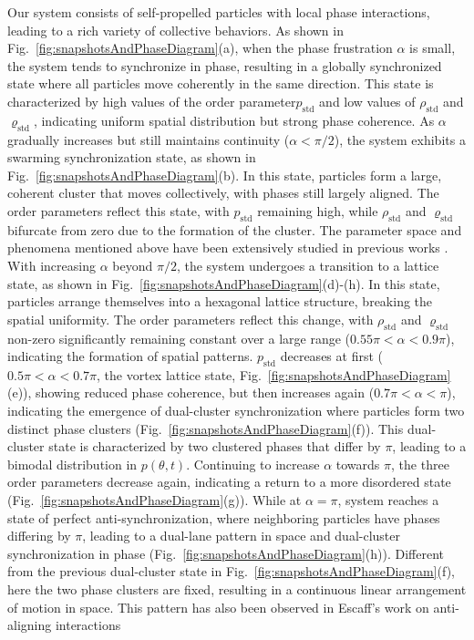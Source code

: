 \documentclass{article}
\begin{document}
Our system consists of self-propelled particles with local phase interactions, leading to a rich variety of collective behaviors. As shown in Fig.~\ref{fig:snapshotsAndPhaseDiagram}(a), when the phase frustration $\alpha$ is small, the system tends to synchronize in phase, resulting in a globally synchronized state where all particles move coherently in the same direction. This state is characterized by high values of the order parameter$p_{\mathrm{std}}$ and low values of $\rho_{\mathrm{std}}$ and $\varrho_{\mathrm{std}}$, indicating uniform spatial distribution but strong phase coherence. As $\alpha$ gradually increases but still maintains continuity ($\alpha < \pi/2$), the system exhibits a swarming synchronization state, as shown in Fig.~\ref{fig:snapshotsAndPhaseDiagram}(b). In this state, particles form a large, coherent cluster that moves collectively, with phases still largely aligned. The order parameters reflect this state, with $p_{\mathrm{std}}$ remaining high, while $\rho_{\mathrm{std}}$ and $\varrho_{\mathrm{std}}$ bifurcate from zero due to the formation of the cluster. The parameter space and phenomena mentioned above have been extensively studied in previous works \cite{PhysRevE.98.032219,PhysRevE.102.022604}.
With increasing $\alpha$ beyond $\pi/2$, the system undergoes a transition to a lattice state, as shown in Fig.~\ref{fig:snapshotsAndPhaseDiagram}(d)-(h). In this state, particles arrange themselves into a hexagonal lattice structure, breaking the spatial uniformity. The order parameters reflect this change, with $\rho_{\mathrm{std}}$ and $\varrho_{\mathrm{std}}$ non-zero significantly remaining constant over a large range ($0.55\pi<\alpha<0.9\pi$), indicating the formation of spatial patterns. $p_{\mathrm{std}}$ decreases at first ($0.5\pi<\alpha<0.7\pi$, the vortex lattice state, Fig.~\ref{fig:snapshotsAndPhaseDiagram}(e)), showing reduced phase coherence, but then increases again ($0.7\pi<\alpha<\pi$), indicating the emergence of dual-cluster synchronization where particles form two distinct phase clusters (Fig.~\ref{fig:snapshotsAndPhaseDiagram}(f)). This dual-cluster state is characterized by two clustered phases that differ by $\pi$, leading to a bimodal distribution in $p(\theta, t)$. 
Continuing to increase $\alpha$ towards $\pi$, the three order parameters decrease again, indicating a return to a more disordered state (Fig.~\ref{fig:snapshotsAndPhaseDiagram}(g)).
While at $\alpha = \pi$, system reaches a state of perfect anti-synchronization, where neighboring particles have phases differing by $\pi$, leading to a dual-lane pattern in space and dual-cluster synchronization in phase (Fig.~\ref{fig:snapshotsAndPhaseDiagram}(h)). Different from the previous dual-cluster state in Fig.~\ref{fig:snapshotsAndPhaseDiagram}(f), here the two phase clusters are fixed, resulting in a continuous linear arrangement of motion in space. This pattern has also been observed in Escaff's work on anti-aligning interactions \cite{PhysRevE.109.024602,PhysRevE.110.024603}
\end{document}
